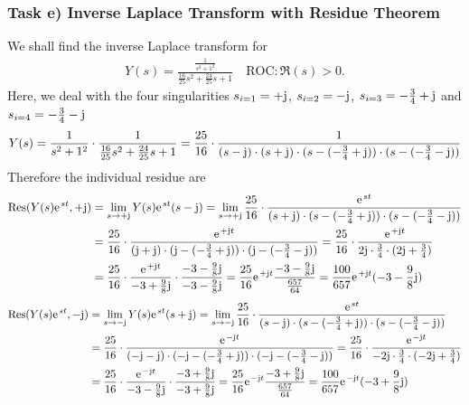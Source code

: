 \documentclass[11pt,a4paper,DIV=12]{scrartcl}
\begin{document}
\subsubsection{Task e) Inverse Laplace Transform with Residue Theorem}
We shall find the inverse Laplace transform for
\begin{align}
	Y(s) = \frac{\frac{1}{s^2 + 1^2}}{\frac{16}{25} s^2 + \frac{24}{25} s + 1}
\quad \text{ROC}: \Re(s) > 0
	.
\end{align}
Here, we deal with the four singularities
$s_{i=1}=+\im$, $s_{i=2}=-\im$, $s_{i=3}=-\frac{3}{4}+\im$ and $s_{i=4}=-\frac{3}{4}-\im$
\begin{align}
	Y(s) = \frac{1}{s^2+1^2}\cdot\frac{1}{\frac{16}{25}s^2+\frac{24}{25}s+1}=\frac{25}{16}\cdot\frac{1}{(s-\im)\cdot(s+\im)\cdot(s-(-\frac{3}{4}+\im))\cdot(s-(-\frac{3}{4}-\im))}
\end{align}
Therefore the individual residue are
\begin{align}
	\mathrm{Res}(Y(s)\e^{st},+\im)&=\lim\limits_{s\rightarrow+\im}Y(s)\e^{st}(s-\im)=\lim\limits_{s\rightarrow +\im} \frac{25}{16}\cdot\frac{\e^{st}}{(s+\im)\cdot(s-(-\frac{3}{4}+\im))\cdot(s-(-\frac{3}{4}-\im))} \nonumber \\
	&= \frac{25}{16}\cdot\frac{\e^{+\im t}}{(\im+\im)\cdot(\im-(-\frac{3}{4}+\im))\cdot(\im-(-\frac{3}{4}-\im))}= \frac{25}{16}\cdot \frac{\e^{+\im t}}{2\im\cdot\frac{3}{4}\cdot(2\im+\frac{3}{4})} \nonumber \\
	&=\frac{25}{16}\cdot\frac{\e^{+\im t}}{-3+\frac{9}{8}\im}\cdot\frac{-3-\frac{9}{8}\im}{-3-\frac{9}{8}\im}=\frac{25}{16}\e^{+\im t}\frac{-3-\frac{9}{8}\im}{\frac{657}{64}}=\frac{100}{657}\e^{+\im t}(-3-\frac{9}{8}\im)
\end{align}
\begin{align}
	\mathrm{Res}(Y(s)\e^{st},-\im)&=\lim\limits_{s\rightarrow-\im}Y(s)\e^{st}(s+\im)=\lim\limits_{s\rightarrow -\im} \frac{25}{16}\cdot\frac{\e^{st}}{(s-\im)\cdot(s-(-\frac{3}{4}+\im))\cdot(s-(-\frac{3}{4}-\im))} \nonumber \\
	&= \frac{25}{16}\cdot\frac{\e^{-\im t}}{(-\im-\im)\cdot(-\im-(-\frac{3}{4}+\im))\cdot(-\im-(-\frac{3}{4}-\im))}= \frac{25}{16}\cdot \frac{\e^{-\im t}}{-2\im\cdot\frac{3}{4}\cdot(-2\im+\frac{3}{4})} \nonumber \\
	&=\frac{25}{16}\cdot\frac{\e^{-\im t}}{-3-\frac{9}{8}\im}\cdot\frac{-3+\frac{9}{8}\im}{-3+\frac{9}{8}\im}=\frac{25}{16}\e^{-\im t}\frac{-3+\frac{9}{8}\im}{\frac{657}{64}}=\frac{100}{657}\e^{-\im t}(-3+\frac{9}{8}\im)
\end{align}
\end{document}
